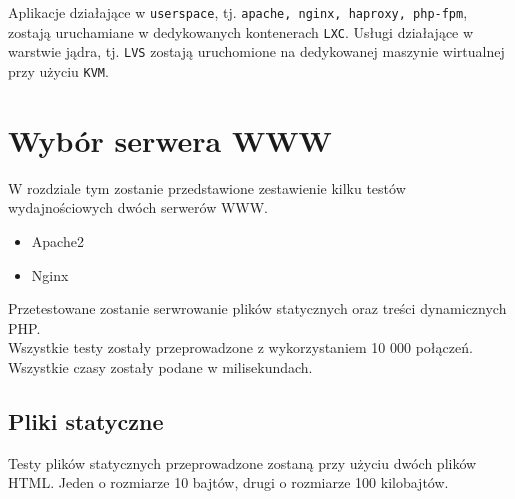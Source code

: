 Aplikacje działające w \texttt{userspace}, tj. \texttt{apache, nginx, haproxy, php-fpm}, zostają uruchamiane w dedykowanych kontenerach \texttt{LXC}.
Usługi działające w warstwie jądra, tj. \texttt{LVS} zostają uruchomione na dedykowanej maszynie wirtualnej przy użyciu \texttt{KVM}.
\section{Wybór serwera WWW}
\label{sec:wybor}
W rozdziale tym zostanie przedstawione zestawienie kilku testów wydajnościowych dwóch serwerów WWW\@.
\begin{itemize}
\item Apache2
\item Nginx
\end{itemize}
Przetestowane zostanie serwrowanie plików statycznych oraz treści dynamicznych PHP{.}\\
Wszystkie testy zostały przeprowadzone z wykorzystaniem 10 000 połączeń.\\
Wszystkie czasy zostały podane w milisekundach.
\subsection{Pliki statyczne}
Testy plików statycznych przeprowadzone zostaną przy użyciu dwóch plików HTML{.}
Jeden o rozmiarze 10 bajtów, drugi o rozmiarze 100 kilobajtów.

